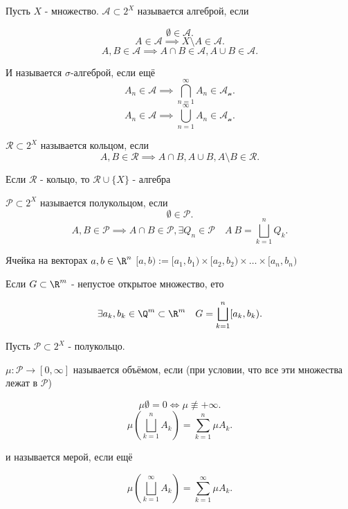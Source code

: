 
\begin{definition} \thmslashn 

    Пусть $X$ - множество. $\mathcal{A} \subset 2^{X}$ называется алгеброй, если
    
    \[ \emptyset\in \mathcal{A} .\] 
    \[ A\in \mathcal{A} \implies X \setminus A\in \mathcal{A} .\] 
    \[ A, B\in \mathcal{A} \implies A\cap B \in \mathcal{A}, A \cup B\in \mathcal{A} .\] 


    И называется $\sigma$-алгеброй, если ещё
    \[ A_{n}\in \mathcal{A} \implies \bigcap\limits_{n=1}^{\infty} A_{n}\in \mathcal{A_n}.\] 
    \[ A_{n}\in \mathcal{A} \implies \bigcup\limits_{n=1}^{\infty} A_{n}\in \mathcal{A_n}.\] 
\end{definition}
\begin{definition}[Кольцо] \thmslashn 

    $\mathcal{R} \subset 2^{X}$ называется кольцом, если
    \[ A, B\in \mathcal{R} \implies A\cap B, A \cup B, A \setminus B\in \mathcal{R} .\] 
\end{definition}
\begin{lemma} \thmslashn

    Если $\mathcal{R}$ - кольцо, то $\mathcal{R} \cup \{X\} $ - алгебра
\end{lemma}
\begin{definition}[Полукольцо] \thmslashn 

    $\mathcal{P} \subset 2^{X}$ называется полукольцом, если
    \[ \emptyset\in \mathcal{P} .\]
    \[ A, B\in \mathcal{P} \implies A\cap B \in \mathcal{P}, \exists{Q_{n}\in \mathcal{P}}\quad A \ B = \bigsqcup\limits_{k=1}^{n} Q_{k}    .\] 
\end{definition}
\begin{definition}[Ячейка] \thmslashn 

    Ячейка на векторах $a, b\in \R^{n}$ $[a, b) := [a_1, b_1) \times [a_2, b_2) \times \ldots \times [a_{n}, b_{n})$
\end{definition}
\begin{theorem} \thmslashn

    Если $G \subset \R^{m}$ - непустое открытое множество, ето 

    \[ \exists{a_{k}, b_{k}\in \Q^{m} \subset \R^{m}}\quad G = \bigsqcup\limits_{k=1}^{n} [a_{k}, b_{k})    .\] 
\end{theorem}
\begin{definition} \thmslashn 

    Пусть $\mathcal{P} \subset 2^{X}$ - полукольцо.

    $\mu : \mathcal{P} \to [0, \infty]$ называется объёмом, если (при условии, что все эти множества лежат в $\mathcal{P}$)

    \[ \mu \emptyset = 0 \iff \mu \not \equiv +\infty.\]
    \[ \mu\left( \bigsqcup\limits_{k=1}^{n} A_{k} \right) = \sum\limits_{k=1}^{n} \mu A_{k}  .\] 

    и называется мерой, если ещё
    
    \[ \mu\left( \bigsqcup\limits_{k=1}^{\infty} A_{k} \right) = \sum\limits_{k=1}^{\infty} \mu A_{k}  .\] 
\end{definition}
